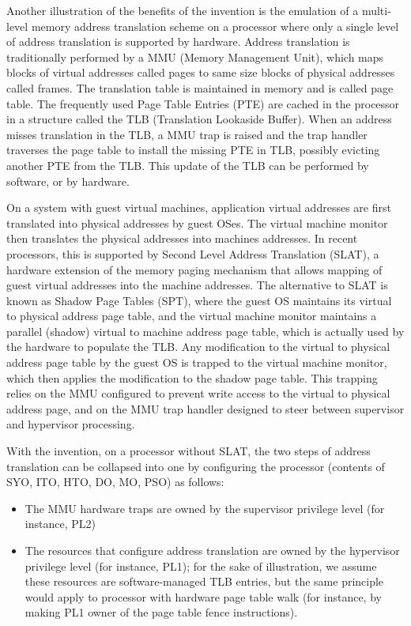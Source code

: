 Another illustration of the benefits of the invention is the emulation of a multi-level memory address translation scheme on a processor where only a single level of address translation is supported by hardware. Address translation is traditionally performed by a MMU (Memory Management Unit), which maps blocks of virtual addresses called pages to same size blocks of physical addresses called frames. The translation table is maintained in memory and is called page table. The frequently used Page Table Entries (PTE) are cached in the processor in a structure called the TLB (Translation Lookaside Buffer). When an address misses translation in the TLB, a MMU trap is raised and the trap handler traverses the page table to install the missing PTE in TLB, possibly evicting another PTE from the TLB. This update of the TLB can be performed by software, or by hardware.

On a system with guest virtual machines, application virtual addresses are first translated into physical addresses by guest OSes. The virtual machine monitor then translates the physical addresses into machines addresses. In recent processors, this is supported by Second Level Address Translation (SLAT), a hardware extension of the memory paging mechanism that allows mapping of guest virtual addresses into the machine addresses. The alternative to SLAT is known as Shadow Page Tables (SPT), where the guest OS maintains its virtual to physical address page table, and the virtual machine monitor maintains a parallel (shadow) virtual to machine address page table, which is actually used by the hardware to populate the TLB. Any modification to the virtual to physical address page table by the guest OS is trapped to the virtual machine monitor, which then applies the modification to the shadow page table. This trapping relies on the MMU configured to prevent write access to the virtual to physical address page, and on the MMU trap handler designed to steer between supervisor and hypervisor processing.

With the invention, on a processor without SLAT, the two steps of address translation can be collapsed into one by configuring the processor (contents of SYO, ITO, HTO, DO, MO, PSO) as follows:
\begin{itemize}
    \item The MMU hardware traps are owned by the supervisor privilege level (for instance, PL2)
    \item The resources that configure address translation are owned by the hypervisor privilege level (for instance, PL1); for the sake of illustration, we assume these resources are software-managed TLB entries, but the same principle would apply to processor with hardware page table walk (for instance, by making PL1 owner of the page table fence instructions).
\end{itemize}

